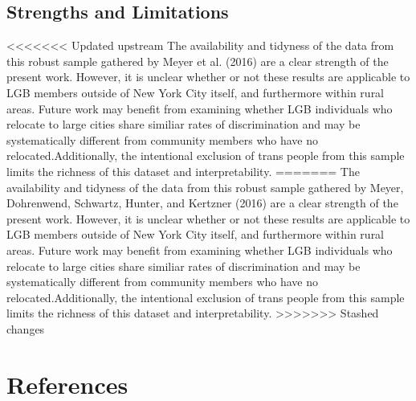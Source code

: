 \documentclass[
  english,
  man,floatsintext]{apa6}
\begin{document}
\hypertarget{strengths-and-limitations}{%
\subsection{Strengths and Limitations}\label{strengths-and-limitations}}

<<<<<<< Updated upstream
The availability and tidyness of the data from this robust sample gathered by Meyer et al. (2016) are a clear strength of the present work. However, it is unclear whether or not these results are applicable to LGB members outside of New York City itself, and furthermore within rural areas. Future work may benefit from examining whether LGB individuals who relocate to large cities share similiar rates of discrimination and may be systematically different from community members who have no relocated.Additionally, the intentional exclusion of trans people from this sample limits the richness of this dataset and interpretability.
=======
The availability and tidyness of the data from this robust sample gathered by Meyer, Dohrenwend, Schwartz, Hunter, and Kertzner (2016) are a clear strength of the present work. However, it is unclear whether or not these results are applicable to LGB members outside of New York City itself, and furthermore within rural areas. Future work may benefit from examining whether LGB individuals who relocate to large cities share similiar rates of discrimination and may be systematically different from community members who have no relocated.Additionally, the intentional exclusion of trans people from this sample limits the richness of this dataset and interpretability.
>>>>>>> Stashed changes
\newpage

\hypertarget{references}{%
\section{References}\label{references}}

\begingroup
\setlength{\parindent}{-0.5in}
\setlength{\leftskip}{0.5in}
\end{document}
